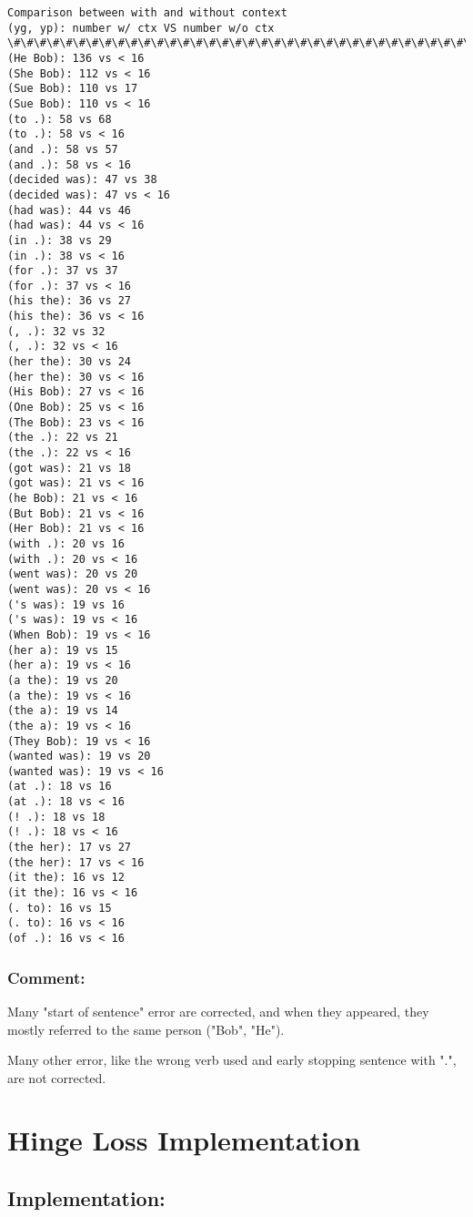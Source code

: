 \documentclass[11pt]{article}
\begin{document}
    \begin{Verbatim}[commandchars=\\\{\}]
Comparison between with and without context
(yg, yp): number w/ ctx VS number w/o ctx
\#\#\#\#\#\#\#\#\#\#\#\#\#\#\#\#\#\#\#\#\#\#\#\#\#\#\#\#\#\#\#\#\#\#\#\#\#\#\#\#\#\#
(He Bob): 136 vs < 16
(She Bob): 112 vs < 16
(Sue Bob): 110 vs 17
(Sue Bob): 110 vs < 16
(to .): 58 vs 68
(to .): 58 vs < 16
(and .): 58 vs 57
(and .): 58 vs < 16
(decided was): 47 vs 38
(decided was): 47 vs < 16
(had was): 44 vs 46
(had was): 44 vs < 16
(in .): 38 vs 29
(in .): 38 vs < 16
(for .): 37 vs 37
(for .): 37 vs < 16
(his the): 36 vs 27
(his the): 36 vs < 16
(, .): 32 vs 32
(, .): 32 vs < 16
(her the): 30 vs 24
(her the): 30 vs < 16
(His Bob): 27 vs < 16
(One Bob): 25 vs < 16
(The Bob): 23 vs < 16
(the .): 22 vs 21
(the .): 22 vs < 16
(got was): 21 vs 18
(got was): 21 vs < 16
(he Bob): 21 vs < 16
(But Bob): 21 vs < 16
(Her Bob): 21 vs < 16
(with .): 20 vs 16
(with .): 20 vs < 16
(went was): 20 vs 20
(went was): 20 vs < 16
('s was): 19 vs 16
('s was): 19 vs < 16
(When Bob): 19 vs < 16
(her a): 19 vs 15
(her a): 19 vs < 16
(a the): 19 vs 20
(a the): 19 vs < 16
(the a): 19 vs 14
(the a): 19 vs < 16
(They Bob): 19 vs < 16
(wanted was): 19 vs 20
(wanted was): 19 vs < 16
(at .): 18 vs 16
(at .): 18 vs < 16
(! .): 18 vs 18
(! .): 18 vs < 16
(the her): 17 vs 27
(the her): 17 vs < 16
(it the): 16 vs 12
(it the): 16 vs < 16
(. to): 16 vs 15
(. to): 16 vs < 16
(of .): 16 vs < 16

    \end{Verbatim}

    \subsubsection{Comment:}\label{comment}

Many "start of sentence" error are corrected, and when they appeared,
they mostly referred to the same person ("Bob", "He").

Many other error, like the wrong verb used and early stopping sentence
with ".", are not corrected.

    \section{Hinge Loss Implementation}\label{hinge-loss-implementation}

    \subsection{Implementation:}\label{implementation}
\end{document}
